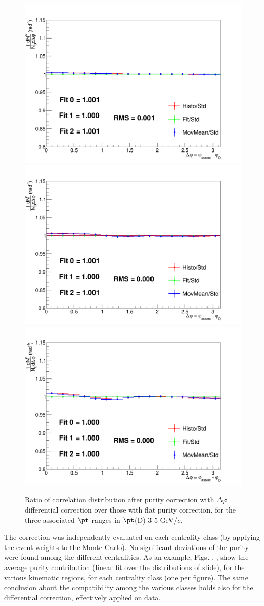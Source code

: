 \begin{figure}
\centering
{\includegraphics[width=0.45\linewidth]{figuresVsCent/Global/Purity/PurityCheck1.png}}
{\includegraphics[width=0.45\linewidth]{figuresVsCent/Global/Purity/PurityCheck2.png}} \\
{\includegraphics[width=0.45\linewidth]{figuresVsCent/Global/Purity/PurityCheck3.png}}
 \caption{Ratio of correlation distribution after purity correction with $\Delta\varphi$ differential correction over those with flat purity correction, for the three associated $\pt$ ranges in $\pt$(D) 3-5 GeV/$c$.}
\label{fig:PurityAppr}
\end{figure}

The correction was independently evaluated on each centrality class (by applying the event weights to the Monte Carlo).
No significant deviations of the purity were found among the different centralities.
As an example, Figs. \label{fig:PurityFlat020}, \label{fig:PurityFlat2060}, \label{fig:PurityFlat60100} show the average purity contribution (linear fit over the distributions of slide), for the various kinematic regions, for each centrality class (one per figure). The same conclusion about the compatibility among the various classes holds also for the differential correction, effectively applied on data.

